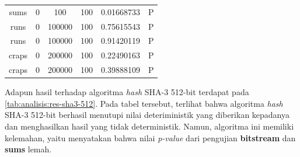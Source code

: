 \documentclass[conference]{IEEEtran}
\newcommand{\en}[1]
    {\foreignlanguage{english}{\textit{#1}}}
\begin{document}
\begin{table}[htbp]
\begin{center}
\begin{tabular}{|c|c|c|c|c|c|}
            sums           & 0            & 100          & 100          & 0.01668733            & P              \\
            runs           & 0            & 100000       & 100          & 0.75615543            & P              \\
            runs           & 0            & 100000       & 100          & 0.91420119            & P              \\
            craps          & 0            & 200000       & 100          & 0.22490163            & P              \\
            craps          & 0            & 200000       & 100          & 0.39888109            & P              \\
            \hline
        \end{tabular}
    \end{center}
\end{table}

Adapun hasil  terhadap algoritma \en{hash} SHA-3 512-bit terdapat pada \autoref{tab:analisis:res-sha3-512}.
Pada tabel tersebut, terlihat bahwa algoritma \en{hash} SHA-3 512-bit berhasil menutupi nilai deteriministik yang diberikan kepadanya dan menghasilkan hasil yang tidak deterministik. Namun, algoritma ini memiliki kelemahan, yaitu  menyatakan bahwa nilai \en{p-value} dari pengujian \textbf{bitstream} dan \textbf{sums} lemah.
\end{document}
